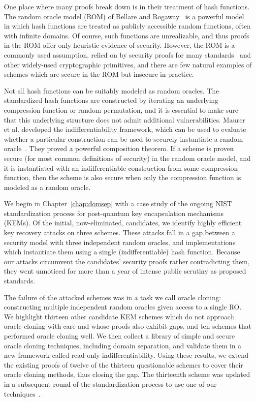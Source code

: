 
One place where many proofs break down is in their treatment of hash functions. The random oracle model (ROM) of Bellare and Rogaway~\cite{BR93} is a powerful model in which hash functions are treated as publicly accessible random functions, often with infinite domains. Of course, such functions are unrealizable, and thus proofs in the ROM offer only heuristic evidence of security. However, the ROM is a commonly used assumption, relied on by security proofs for many standards~\cite{JC:DieJag21, EC:PoiSte96, SP:BCJZ21, EC:BDPV08, C:CDMP05} and other widely-used cryptographic primitives, and there are few natural examples of schemes which are secure in the ROM but insecure in practice.

Not all hash functions can be suitably modeled as random oracles. The standardized hash functions are constructed by iterating an underlying compression function or random permutation, and it is essential to make sure that this underlying structure does not admit additional vulnerabilities. Maurer et al. developed the indifferentiability framework, which can be used to evaluate whether a particular construction can be used to securely instantiate a random oracle~\cite{TCC:MauRenHol04}. They proved a powerful composition theorem. If a scheme is proven secure (for most common definitions of security) in the random oracle model, and it is instantiated with an indifferentiable construction from some compression function, then the scheme is also secure when only the compression function is modeled as a random oracle. 


We begin in Chapter~\ref{chap:domsep} with a case study of the ongoing NIST standardization process for post-quantum key encapsulation mechanisms (KEMs). Of the initial, now-eliminated, candidates, we identify highly efficient key recovery attacks on three schemes. These attacks fall in a gap between a security model with three independent random oracles, and implementations which instantiate them using a single (indifferentiable) hash function. Because our attacks circumvent the candidates' security proofs rather contradicting them, they went unnoticed for more than a year of intense public scrutiny as proposed standards. 

The failure of the attacked schemes was in a task we call oracle cloning: constructing multiple independent random oracles given access to a single RO. We highlight thirteen other candidate KEM schemes which do not approach oracle cloning with care and whose proofs also exhibit gaps, and ten schemes that performed oracle cloning well. We then collect a library of simple and secure oracle cloning techniques, including domain separation, and validate them in a new framework called read-only indifferentiability. Using these results, we extend the existing proofs of twelve of the thirteen questionable schemes to cover their oracle cloning methods, thus closing the gap. The thirteenth scheme was updated in a subsequent round of the standardization process to use one of our techniques~\cite{nistpqc:NewHope}. 

